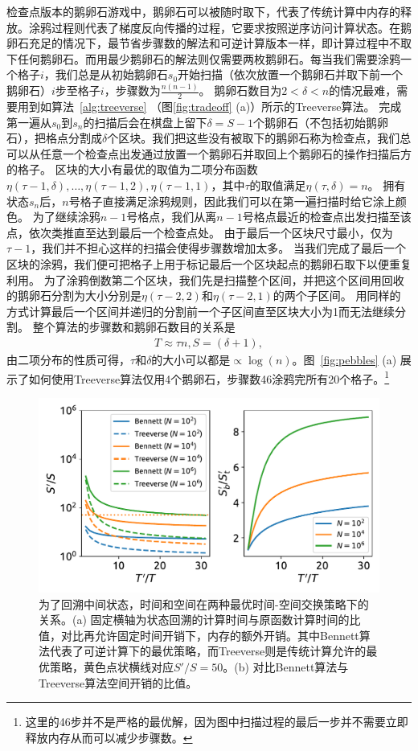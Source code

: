 \documentclass[A4,twoside,fontset=ubuntu,UTF8]{ctexart}
\begin{document}
检查点版本的鹅卵石游戏中，鹅卵石可以被随时取下，代表了传统计算中内存的释放。涂鸦过程则代表了梯度反向传播的过程，它要求按照逆序访问计算状态。在鹅卵石充足的情况下，最节省步骤数的解法和可逆计算版本一样，即计算过程中不取下任何鹅卵石。而用最少鹅卵石的解法则仅需要两枚鹅卵石。每当我们需要涂鸦一个格子$i$，我们总是从初始鹅卵石$s_0$开始扫描（依次放置一个鹅卵石并取下前一个鹅卵石）$i$步至格子$i$，步骤数为$\frac{n(n-1)}{2}$。
鹅卵石数目为$2<\delta<n$的情况最难，需要用到如算法~\ref{alg:treeverse} （图\ref{fig:tradeoff} (a)）所示的Treeverse算法。
完成第一遍从$s_0$到$s_{n}$的扫描后会在棋盘上留下$\delta=S-1$个鹅卵石（不包括初始鹅卵石），把格点分割成$\delta$个区块。我们把这些没有被取下的鹅卵石称为检查点，我们总可以从任意一个检查点出发通过放置一个鹅卵石并取回上个鹅卵石的操作扫描后方的格子。
区块的大小有最优的取值为二项分布函数$\eta(\tau-1, \delta), \ldots, \eta(\tau-1, 2), \eta(\tau-1, 1)$，其中$\tau$的取值满足$\eta(\tau, \delta) = n$。
拥有状态$s_{n}$后，$n$号格子直接满足涂鸦规则，因此我们可以在第一遍扫描时给它涂上颜色。
为了继续涂鸦$n-1$号格点，我们从离$n-1$号格点最近的检查点出发扫描至该点，依次类推直至达到最后一个检查点处。
由于最后一个区块尺寸最小，仅为$\tau-1$，我们并不担心这样的扫描会使得步骤数增加太多。
当我们完成了最后一个区块的涂鸦，我们便可把格子上用于标记最后一个区块起点的鹅卵石取下以便重复利用。
为了涂鸦倒数第二个区块，我们先是扫描整个区间，并把这个区间用回收的鹅卵石分割为大小分别是$\eta(\tau-2, 2)$和$\eta(\tau-2, 1)$的两个子区间。
用同样的方式计算最后一个区间并递归的分割前一个子区间直至区块大小为1而无法继续分割。
整个算法的步骤数和鹅卵石数目的关系是
\begin{align}
    T \approx \tau n, S = (\delta+1),
\end{align}
由二项分布的性质可得，$\tau$和$\delta$的大小可以都是$\propto\log(n)$。图~\ref{fig:pebbles} (a) 展示了如何使用Treeverse算法仅用4个鹅卵石，步骤数46涂鸦完所有20个格子。\footnote{这里的46步并不是严格的最优解，因为图中扫描过程的最后一步并不需要立即释放内存从而可以减少步骤数。}

\begin{figure}[h]
\centering
\includegraphics[width=0.8\columnwidth]{./fig1.pdf}
    \caption{为了回溯中间状态，时间和空间在两种最优时间-空间交换策略下的关系。(a) 固定横轴为状态回溯的计算时间与原函数计算时间的比值，对比再允许固定时间开销下，内存的额外开销。其中Bennett算法代表了可逆计算下的最优策略，而Treeverse则是传统计算允许的最优策略，黄色点状横线对应$S'/S=50$。(b) 对比Bennett算法与Treeverse算法空间开销的比值。\label{fig:timespace}} 
\end{figure}
\end{document}
